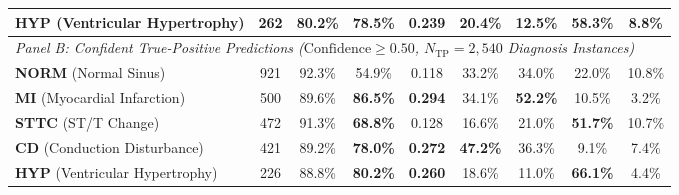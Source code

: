 \documentclass[12pt]{elsarticle}
\begin{document}
\begin{table}[t]
{\begin{tabular}{lcccccccc}
\textbf{HYP} (Ventricular Hypertrophy) & 262 & 80.2\% & \textbf{78.5\%} & \textbf{0.239} & 20.4\% & 12.5\% & \textbf{58.3\%} & 8.8\% \\
\midrule
\multicolumn{9}{l}{\textit{Panel B: Confident True-Positive Predictions ($\text{Confidence} \ge 0.50$, $N_{\text{TP}} = 2,540$ Diagnosis Instances)}} \\
\midrule
\textbf{NORM} (Normal Sinus) & 921 & 92.3\% & 54.9\% & 0.118 & 33.2\% & 34.0\% & 22.0\% & 10.8\% \\
\textbf{MI} (Myocardial Infarction) & 500 & 89.6\% & \textbf{86.5\%} & \textbf{0.294} & 34.1\% & \textbf{52.2\%} & 10.5\% & 3.2\% \\
\textbf{STTC} (ST/T Change) & 472 & 91.3\% & \textbf{68.8\%} & 0.128 & 16.6\% & 21.0\% & \textbf{51.7\%} & 10.7\% \\
\textbf{CD} (Conduction Disturbance) & 421 & 89.2\% & \textbf{78.0\%} & \textbf{0.272} & \textbf{47.2\%} & 36.3\% & 9.1\% & 7.4\% \\
\textbf{HYP} (Ventricular Hypertrophy) & 226 & 88.8\% & \textbf{80.2\%} & \textbf{0.260} & 18.6\% & 11.0\% & \textbf{66.1\%} & 4.4\% \\
\bottomrule
\end{tabular}%
}
\end{table}
\end{document}
